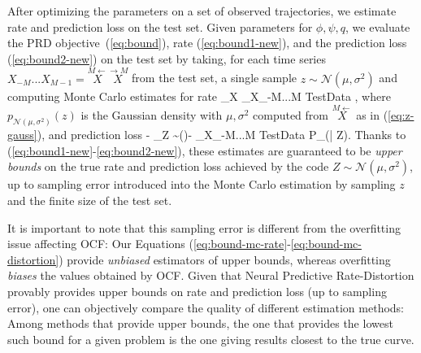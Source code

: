 \documentclass[entropy,article,submit,moreauthors,pdftex,10pt,a4paper]{Definitions/mdpi}
\newcommand{\finitefuture}{\stackrel{\rightarrow \scriptscriptstyle{M}}{X}}
\newcommand{\finitepast}{\stackrel{\scriptscriptstyle{M}\leftarrow}{X}}%
\let\oldequation\equation
\let\oldendequation\endequation
\renewenvironment{equation}
  {\linenomathNonumbers\oldequation}
  {\oldendequation\endlinenomath}
\begin{document}
After optimizing the parameters on a set of observed trajectories, we estimate rate and prediction loss on the test set.
Given parameters for $\phi, \psi, q$, we evaluate the PRD objective~(\ref{eq:bound}), rate (\ref{eq:bound1-new}), and the prediction loss (\ref{eq:bound2-new}) on the test set by taking, for each time series $X_{-M}...X_{M-1} = \finitepast\finitefuture$ from the test set, a single sample $z  \sim \mathcal{N}(\mu, \sigma^2)$ and computing Monte Carlo estimates for rate
\begin{equation}\label{eq:bound-mc-rate}
_{X}\left[ \operatorname{D_{KL}}\infdivx{P_\phi(Z|\finitepast)}{q(Z)}\right] \approx	{}	\sum_{X_{-M...M} \in TestData}  \log {},
\end{equation}
where $p_{\mathcal{N}(\mu, \sigma^2)}(z)$ is the Gaussian density with $\mu, \sigma^2$ computed from $\finitepast$ as in (\ref{eq:z-gauss}), and prediction loss 
\begin{equation}\label{eq:bound-mc-distortion}
 -	_{Z \sim \phi(\finitepast)}\left[\log P_\psi(\finitefuture | Z)\right] \approx - 	\sum_{X_{-M...M} \in TestData}	\log P_\psi(\finitefuture | Z).
\end{equation}
Thanks to (\ref{eq:bound1-new}-\ref{eq:bound2-new}), these estimates are guaranteed to be \emph{upper bounds} on the true rate and prediction loss achieved by the code $Z  \sim \mathcal{N}(\mu, \sigma^2)$, up to sampling error introduced into the Monte Carlo estimation by sampling $z$ and the finite size of the test set.



It is important to note that this sampling error is different from the overfitting issue affecting OCF: 
Our Equations (\ref{eq:bound-mc-rate}-\ref{eq:bound-mc-distortion}) provide \emph{unbiased} estimators of upper bounds, whereas overfitting \emph{biases} the values obtained by OCF.
Given that Neural Predictive Rate-Distortion provably provides upper bounds on rate and prediction loss (up to sampling error), one can objectively compare the quality of different estimation methods:
Among methods that provide upper bounds, the one that provides the lowest such bound for a given problem is the one giving results closest to the true curve.
\end{document}
